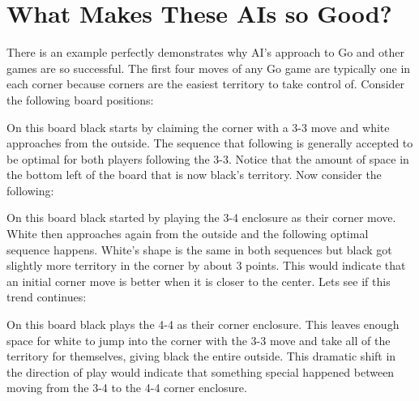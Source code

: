 \documentclass[12pt]{IEEEtran}
\begin{document}
\section{What Makes These AIs so Good?}
\par There is an example perfectly demonstrates why AI's approach to Go and other games are so successful. The first four moves of any Go game are typically one in each corner because corners are the easiest territory to take control of. Consider the following board positions: 


\scalebox{1}{\showgoban} 
\cleargoban

\par On this board black starts by claiming the corner with a 3-3 move and white approaches from the outside. The sequence that following is generally accepted to be optimal for both players following the 3-3. Notice that the amount of space in the bottom left of the board that is now black's territory. Now consider the following: 

\scalebox{1}{\showgoban} 
\cleargoban

\par On this board black started by playing the 3-4 enclosure as their corner move. White then approaches again from the outside and the following optimal sequence happens. White's shape is the same in both sequences but black got slightly more territory in the corner by about 3 points. This would indicate that an initial corner move is better when it is closer to the center. Lets see if this trend continues:\\

\scalebox{1}{\showgoban} 
\cleargoban

\par On this board black plays the 4-4 as their corner enclosure. This leaves enough space for white to jump into the corner with the 3-3 move and take all of the territory for themselves, giving black the entire outside. This dramatic shift in the direction of play would indicate that something special happened between moving from the 3-4 to the 4-4 corner enclosure. 
\end{document}

